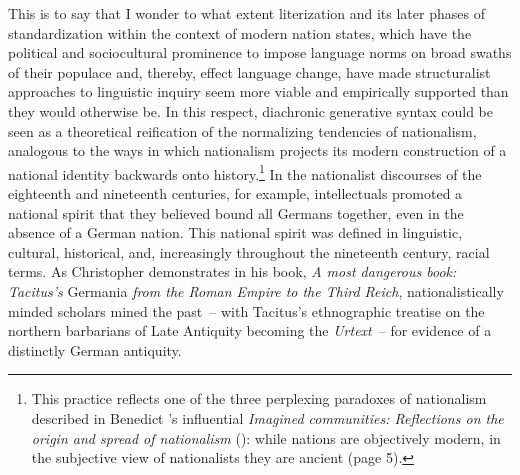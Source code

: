 This is to say that I wonder to what extent literization and its later phases of standardization within the context of modern nation states, which have the political and sociocultural prominence to impose language norms on broad swaths of their populace and, thereby, effect language change, have made structuralist approaches to linguistic inquiry seem more viable and empirically supported than they would otherwise be. In this respect, diachronic generative syntax could be seen as a theoretical reification of the normalizing tendencies of nationalism, analogous to the ways in which nationalism projects its modern construction of a national identity backwards onto history.\footnote{This practice reflects one of the three perplexing paradoxes of nationalism described in Benedict \citeauthor{Anderson2006}’s influential \textit{Imagined communities: Reflections on the origin and spread of nationalism} (\citeyear{Anderson2006}): while nations are objectively modern, in the subjective view of nationalists they are ancient (page 5).} In the nationalist discourses of the eighteenth and nineteenth centuries, for example, intellectuals promoted a national spirit that they believed bound all Germans together, even in the absence of a German nation. This national spirit was defined in linguistic, cultural, historical, and, increasingly throughout the nineteenth century, racial terms. As Christopher \citeauthor{Krebs2011} demonstrates in his \citeyear{Krebs2011} book, \textit{A most dangerous book: Tacitus’s} Germania \textit{from the Roman Empire to the Third Reich}, nationalistically minded scholars mined the past~-- with Tacitus’s ethnographic treatise on the northern barbarians of Late Antiquity becoming the \textit{Urtext}~-- for evidence of a distinctly German antiquity.

